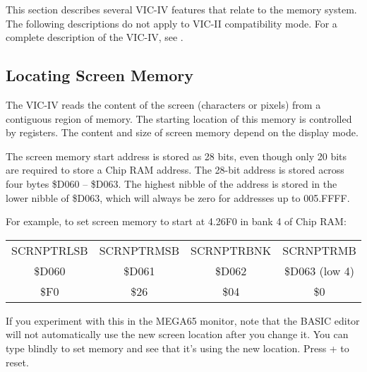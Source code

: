 This section describes several VIC-IV features that relate to the memory system. The following descriptions do not apply to VIC-II compatibility mode. For a complete description of the VIC-IV, see .

\subsection{Locating Screen Memory}

The VIC-IV reads the content of the screen (characters or pixels) from a contiguous region of memory. The starting location of this memory is controlled by registers. The content and size of screen memory depend on the display mode.

The screen memory start address is stored as 28 bits, even though only 20 bits are required to store a Chip RAM address. The 28-bit address is stored across four bytes \$D060 -- \$D063. The highest nibble of the address is stored in the lower nibble of \$D063, which will always be zero for addresses up to 005.FFFF.

For example, to set screen memory to start at 4.26F0 in bank 4 of Chip RAM:

\begin{center}
\begin{tabular}{|c|c|c|c|}
\hline
SCRNPTRLSB & SCRNPTRMSB & SCRNPTRBNK & SCRNPTRMB \\
\$D060 & \$D061 & \$D062 & \$D063 (low 4) \\
\hline
\$F0 & \$26 & \$04 & \$0 \\
\hline
\end{tabular}
\end{center}


If you experiment with this in the MEGA65 monitor, note that the BASIC editor will not automatically use the new screen location after you change it. You can type blindly to set memory and see that it's using the new location. Press  +  to reset.

